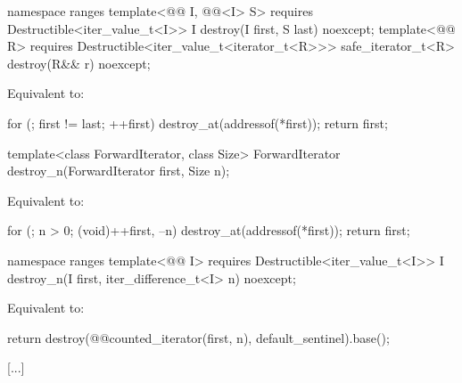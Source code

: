 \begin{addedblock}
%
\begin{itemdecl}
namespace ranges {
  template<@@ I, @@<I> S>
      requires Destructible<iter_value_t<I>>
    I destroy(I first, S last) noexcept;
  template<@@ R>
      requires Destructible<iter_value_t<iterator_t<R>>>
    safe_iterator_t<R> destroy(R&& r) noexcept;
}
\end{itemdecl}

\begin{itemdescr}
\pnum
\effects Equivalent to:
\begin{codeblock}
for (; first != last; ++first)
  destroy_at(addressof(*first));
return first;
\end{codeblock}
\end{itemdescr}
\end{addedblock}

%
\begin{itemdecl}
template<class ForwardIterator, class Size>
  ForwardIterator destroy_n(ForwardIterator first, Size n);
\end{itemdecl}

\begin{itemdescr}
\pnum
\effects
Equivalent to:
\begin{codeblock}
for (; n > 0; (void)++first, --n)
  destroy_at(addressof(*first));
return first;
\end{codeblock}
\end{itemdescr}

\begin{addedblock}
%
\begin{itemdecl}
namespace ranges {
  template<@@ I>
      requires Destructible<iter_value_t<I>>
    I destroy_n(I first, iter_difference_t<I> n) noexcept;
}
\end{itemdecl}

\begin{itemdescr}
\pnum
\effects Equivalent to:
\begin{codeblock}
return destroy(@@counted_iterator(first, n), default_sentinel{}).base();
\end{codeblock}
\end{itemdescr}
\end{addedblock}

[...]

